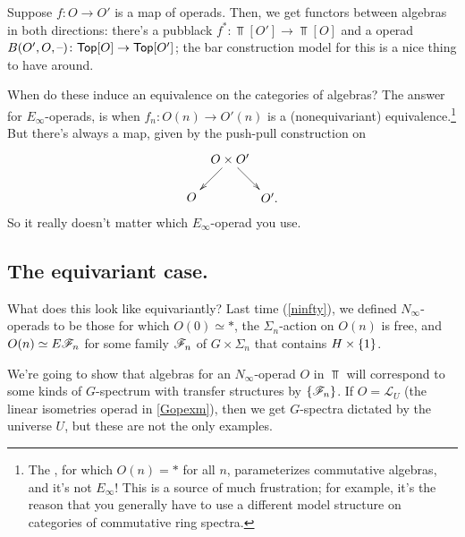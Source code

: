 Suppose $f\colon O\to O'$ is a map of operads. Then, we get functors between algebras in both directions: there's a
pubblack $f^*\colon\Top[O']\to\Top[O]$ and a  operad $B(O',O,\text{--})\colon\mathsf{Top}[O]\to\mathsf{Top}[O']$;
the bar construction model for this is a nice thing to have around.

When do these induce an equivalence on the categories of algebras? The answer for $E_\infty$-operads,
is when $f_n\colon O(n)\to O'(n)$ is a (nonequivariant) equivalence.\footnote{The , for
which $O(n) = *$ for all $n$, parameterizes commutative algebras, and it's not $E_\infty$! This is a source of much
frustration; for example, it's the reason that you generally have to use a different model structure on categories
of commutative ring spectra.} But there's always a map, given by the push-pull construction on
\[\xymatrix@dr{
	O\times O'\ar[r]\ar[d] & O'.\\
	O
}\]
So it really doesn't matter which $E_\infty$-operad you use.
\subsection*{The equivariant case.} What does this look like equivariantly? Last time (\cref{ninfty}), we defined
$N_\infty$-operads to be those for which $O(0)\simeq *$, the $\Sigma_n$-action on $O(n)$ is free, and $O(n)\simeq
E\mathscr F_n$ for some family $\mathscr F_n$ of $G\times\Sigma_n$ that contains $H\times\{1\}$.

We're going to show that algebras for an $N_\infty$-operad $O$ in $\Top$ will correspond to some kinds of $G$-spectrum
with transfer structures by $\{\mathscr F_n\}$. If $O = \mathcal L_U$ (the linear isometries operad in \cref{Gopexm}),
then we get $G$-spectra dictated by the universe $U$, but these are not the only examples.

